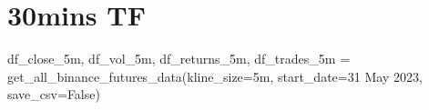 \documentclass[
  letterpaper,
  DIV=11,
  numbers=noendperiod]{scrartcl}
\newenvironment{Shaded}{\begin{snugshade}}{\end{snugshade}}
\newcommand{\NormalTok}[1]{\textcolor[rgb]{0.00,0.23,0.31}{#1}}
\newcommand{\OperatorTok}[1]{\textcolor[rgb]{0.37,0.37,0.37}{#1}}
\newcommand{\StringTok}[1]{\textcolor[rgb]{0.13,0.47,0.30}{#1}}
\newcommand{\VariableTok}[1]{\textcolor[rgb]{0.07,0.07,0.07}{#1}}
\begin{document}
\hypertarget{mins-tf}{%
\section{30mins TF}\label{mins-tf}}

\begin{Shaded}
\begin{Highlighting}[]
\NormalTok{df\_close\_5m, df\_vol\_5m, df\_returns\_5m, df\_trades\_5m }\OperatorTok{=}\NormalTok{ get\_all\_binance\_futures\_data(kline\_size}\OperatorTok{=}\StringTok{\textquotesingle{}5m\textquotesingle{}}\NormalTok{, start\_date}\OperatorTok{=}\StringTok{\textquotesingle{}31 May 2023\textquotesingle{}}\NormalTok{, save\_csv}\OperatorTok{=}\VariableTok{False}\NormalTok{)}
\end{Highlighting}
\end{Shaded}
\end{document}
